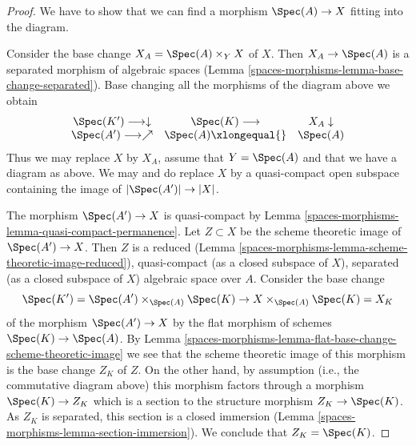 \begin{proof}
We have to show that we can find a morphism $\Spec(A) \to X$ fitting
into the diagram.

\medskip\noindent
Consider the base change $X_A = \Spec(A) \times_Y X$ of $X$.
Then $X_A \to \Spec(A)$ is a separated morphism of algebraic
spaces (Lemma \ref{spaces-morphisms-lemma-base-change-separated}). Base changing
all the morphisms of the diagram above we obtain
$$
\begin{array}{ccc}\Spec(K') \longrightarrow\downarrow & \Spec(K) \longrightarrow & X_A \downarrow \\ \Spec(A') \longrightarrow\nearrow & \Spec(A) \xlongequal{} & \Spec(A)\end{array}
$$
Thus we may replace $X$ by $X_A$, assume that $Y = \Spec(A)$ and
that we have a diagram as above. We may and do replace $X$ by
a quasi-compact open subspace containing the image of $|\Spec(A')| \to |X|$.

\medskip\noindent
The morphism $\Spec(A') \to X$ is quasi-compact by
Lemma \ref{spaces-morphisms-lemma-quasi-compact-permanence}.
Let $Z \subset X$ be the scheme theoretic image of
$\Spec(A') \to X$. Then $Z$ is a reduced
(Lemma \ref{spaces-morphisms-lemma-scheme-theoretic-image-reduced}),
quasi-compact (as a closed subspace of $X$), separated
(as a closed subspace of $X$) algebraic space over $A$.
Consider the base change
$$
\Spec(K') = \Spec(A') \times_{\Spec(A)} \Spec(K) \to
X \times_{\Spec(A)} \Spec(K) = X_K
$$
of the morphism $\Spec(A') \to X$ by the flat morphism of schemes
$\Spec(K) \to \Spec(A)$. By
Lemma \ref{spaces-morphisms-lemma-flat-base-change-scheme-theoretic-image}
we see that the scheme theoretic image of this morphism
is the base change $Z_K$ of $Z$. On the other hand, by
assumption (i.e., the commutative diagram above)
this morphism factors through a morphism
$\Spec(K) \to Z_K$ which is a section to the structure morphism
$Z_K \to \Spec(K)$. As $Z_K$ is separated, this section is a
closed immersion (Lemma \ref{spaces-morphisms-lemma-section-immersion}).
We conclude that $Z_K = \Spec(K)$.


\end{proof}
